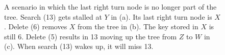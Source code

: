 \begin{figure}
{
}
\caption{A scenario in which the last right turn node is no longer part of the tree. Search (13) gets stalled at $Y$ in (a). Its last right turn node is $X$. Delete (6) removes $X$ from the tree in (b). The key stored in $X$ is still 6. Delete (5) results in 13 moving up the tree from $Z$ to $W$ in (c). When search (13) wakes up, it will miss 13.}
\label{fig:issueInSeek}
\end{figure}
